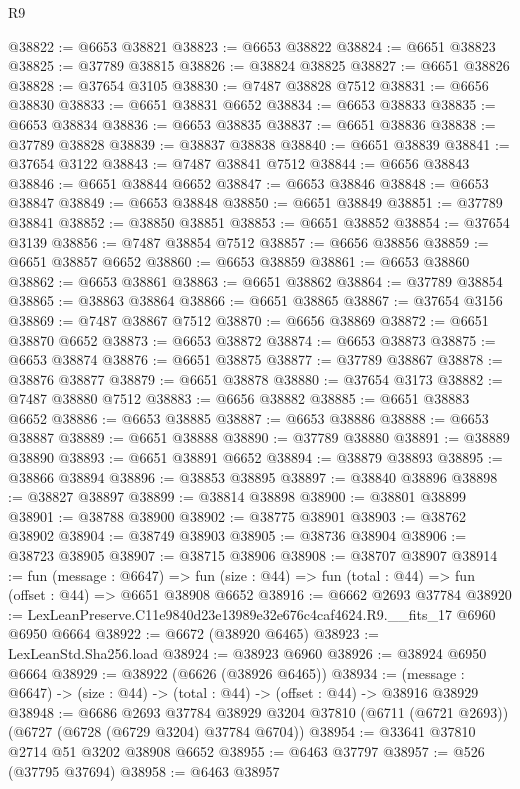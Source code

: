 \begin{lexlean}{R9}
\begin{coremodule}
@38822 := @6653 @38821
@38823 := @6653 @38822
@38824 := @6651 @38823
@38825 := @37789 @38815
@38826 := @38824 @38825
@38827 := @6651 @38826
@38828 := @37654 @3105
@38830 := @7487 @38828 @7512
@38831 := @6656 @38830
@38833 := @6651 @38831 @6652
@38834 := @6653 @38833
@38835 := @6653 @38834
@38836 := @6653 @38835
@38837 := @6651 @38836
@38838 := @37789 @38828
@38839 := @38837 @38838
@38840 := @6651 @38839
@38841 := @37654 @3122
@38843 := @7487 @38841 @7512
@38844 := @6656 @38843
@38846 := @6651 @38844 @6652
@38847 := @6653 @38846
@38848 := @6653 @38847
@38849 := @6653 @38848
@38850 := @6651 @38849
@38851 := @37789 @38841
@38852 := @38850 @38851
@38853 := @6651 @38852
@38854 := @37654 @3139
@38856 := @7487 @38854 @7512
@38857 := @6656 @38856
@38859 := @6651 @38857 @6652
@38860 := @6653 @38859
@38861 := @6653 @38860
@38862 := @6653 @38861
@38863 := @6651 @38862
@38864 := @37789 @38854
@38865 := @38863 @38864
@38866 := @6651 @38865
@38867 := @37654 @3156
@38869 := @7487 @38867 @7512
@38870 := @6656 @38869
@38872 := @6651 @38870 @6652
@38873 := @6653 @38872
@38874 := @6653 @38873
@38875 := @6653 @38874
@38876 := @6651 @38875
@38877 := @37789 @38867
@38878 := @38876 @38877
@38879 := @6651 @38878
@38880 := @37654 @3173
@38882 := @7487 @38880 @7512
@38883 := @6656 @38882
@38885 := @6651 @38883 @6652
@38886 := @6653 @38885
@38887 := @6653 @38886
@38888 := @6653 @38887
@38889 := @6651 @38888
@38890 := @37789 @38880
@38891 := @38889 @38890
@38893 := @6651 @38891 @6652
@38894 := @38879 @38893
@38895 := @38866 @38894
@38896 := @38853 @38895
@38897 := @38840 @38896
@38898 := @38827 @38897
@38899 := @38814 @38898
@38900 := @38801 @38899
@38901 := @38788 @38900
@38902 := @38775 @38901
@38903 := @38762 @38902
@38904 := @38749 @38903
@38905 := @38736 @38904
@38906 := @38723 @38905
@38907 := @38715 @38906
@38908 := @38707 @38907
@38914 := fun (message : @6647) =>
  fun (size : @44) => fun (total : @44) => fun (offset : @44) => @6651 @38908 @6652
@38916 := @6662 @2693 @37784
@38920 := LexLeanPreserve.C11e9840d23e13989e32e676c4caf4624.R9.__fits_17 @6960 @6950 @6664
@38922 := @6672 (@38920 @6465)
@38923 := LexLeanStd.Sha256.load
@38924 := @38923 @6960
@38926 := @38924 @6950 @6664
@38929 := @38922 (@6626 (@38926 @6465))
@38934 := (message : @6647) -> (size : @44) -> (total : @44) -> (offset : @44) -> @38916 @38929
@38948 := @6686
    @2693
    @37784
    @38929
    @3204
    @37810
    (@6711 (@6721 @2693))
    (@6727 (@6728 (@6729 @3204) @37784 @6704))
@38954 := @33641 @37810 @2714 @51 @3202 @38908 @6652
@38955 := @6463 @37797
@38957 := @526 (@37795 @37694)
@38958 := @6463 @38957

\end{coremodule}
\end{lexlean}

